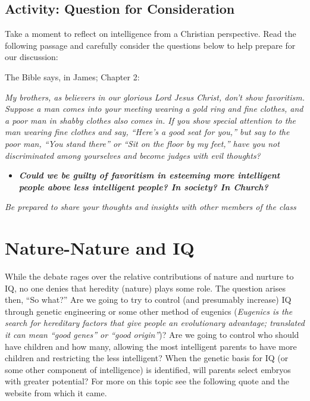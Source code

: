 \documentclass[
]{book}
\providecommand{\tightlist}{%
  \setlength{\itemsep}{0pt}\setlength{\parskip}{0pt}}
\begin{document}
\hypertarget{activity-question-for-consideration-1}{%
\subsection*{Activity: Question for Consideration}\label{activity-question-for-consideration-1}}

\begin{reflect}
Take a moment to reflect on intelligence from a Christian perspective. Read the following passage and carefully consider the questions below to help prepare for our discussion:

The Bible says, in James; Chapter 2:

\emph{My brothers, as believers in our glorious Lord Jesus Christ, don't show favoritism. Suppose a man comes into your meeting wearing a gold ring and fine clothes, and a poor man in shabby clothes also comes in. If you show special attention to the man wearing fine clothes and say, ``Here's a good seat for you,'' but say to the poor man, ``You stand there'' or ``Sit on the floor by my feet,'' have you not discriminated among yourselves and become judges with evil thoughts?}

\begin{itemize}
\tightlist
\item
  \textbf{\emph{Could we be guilty of favoritism in esteeming more intelligent people above less intelligent people? In society? In Church?}}
\end{itemize}

\emph{Be prepared to share your thoughts and insights with other members of the class}
\end{reflect}

\hypertarget{nature-nature-and-iq}{%
\section{Nature-Nature and IQ}\label{nature-nature-and-iq}}

While the debate rages over the relative contributions of nature and nurture to IQ, no one denies that heredity (nature) plays some role. The question arises then, ``So what?'' Are we going to try to control (and presumably increase) IQ through genetic engineering or some other method of eugenics (\emph{Eugenics is the search for hereditary factors that give people an evolutionary advantage; translated it can mean ``good genes'' or ``good origin''})? Are we going to control who should have children and how many, allowing the most intelligent parents to have more children and restricting the less intelligent? When the genetic basis for IQ (or some other component of intelligence) is identified, will parents select embryos with greater potential? For more on this topic see the following quote and the website from which it came.
\end{document}
